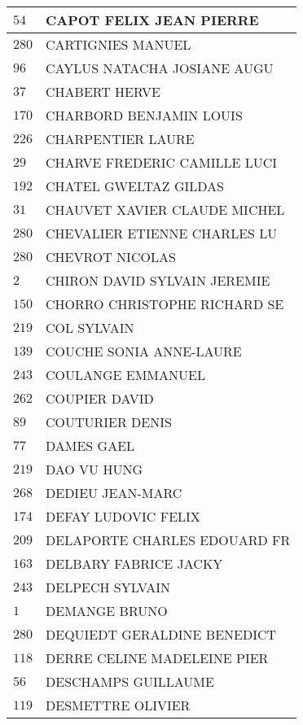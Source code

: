 \begin{xltabular}{\linewidth}{|l|X|}
    \hline
    $54$ & CAPOT FELIX JEAN PIERRE \\
    \hline
    $280$ & CARTIGNIES MANUEL \\
    \hline
    $96$ & CAYLUS NATACHA JOSIANE AUGU \\
    \hline
    $37$ & CHABERT HERVE \\
    \hline
    $170$ & CHARBORD BENJAMIN LOUIS \\
    \hline
    $226$ & CHARPENTIER LAURE \\
    \hline
    $29$ & CHARVE FREDERIC CAMILLE LUCI \\
    \hline
    $192$ & CHATEL GWELTAZ GILDAS \\
    \hline
    $31$ & CHAUVET XAVIER CLAUDE MICHEL \\
    \hline
    $280$ & CHEVALIER ETIENNE CHARLES LU \\
    \hline
    $280$ & CHEVROT NICOLAS \\
    \hline
    $2$ & CHIRON DAVID SYLVAIN JEREMIE \\
    \hline
    $150$ & CHORRO CHRISTOPHE RICHARD SE \\
    \hline
    $219$ & COL SYLVAIN \\
    \hline
    $139$ & COUCHE SONIA ANNE-LAURE \\
    \hline
    $243$ & COULANGE EMMANUEL \\
    \hline
    $262$ & COUPIER DAVID \\
    \hline
    $89$ & COUTURIER DENIS \\
    \hline
    $77$ & DAMES GAEL \\
    \hline
    $219$ & DAO VU HUNG \\
    \hline
    $268$ & DEDIEU JEAN-MARC \\
    \hline
    $174$ & DEFAY LUDOVIC FELIX \\
    \hline
    $209$ & DELAPORTE CHARLES EDOUARD FR \\
    \hline
    $163$ & DELBARY FABRICE JACKY \\
    \hline
    $243$ & DELPECH SYLVAIN \\
    \hline
    $1$ & DEMANGE BRUNO \\
    \hline
    $280$ & DEQUIEDT GERALDINE BENEDICT \\
    \hline
    $118$ & DERRE CELINE MADELEINE PIER \\
    \hline
    $56$ & DESCHAMPS GUILLAUME \\
    \hline
    $119$ & DESMETTRE OLIVIER \\
    \hline

\end{xltabular}
